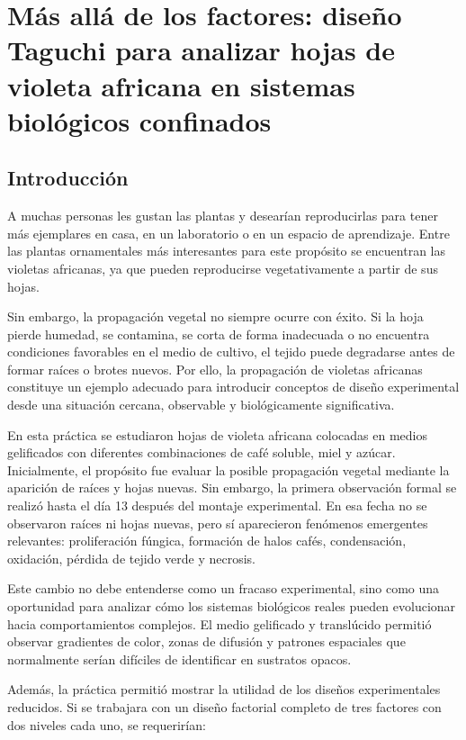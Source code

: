 \section{Más allá de los factores: diseño Taguchi para analizar hojas de violeta africana en sistemas biológicos confinados}

\subsection{Introducción}

A muchas personas les gustan las plantas y desearían reproducirlas para tener más ejemplares en casa, en un laboratorio o en un espacio de aprendizaje. Entre las plantas ornamentales más interesantes para este propósito se encuentran las violetas africanas, ya que pueden reproducirse vegetativamente a partir de sus hojas.

Sin embargo, la propagación vegetal no siempre ocurre con éxito. Si la hoja pierde humedad, se contamina, se corta de forma inadecuada o no encuentra condiciones favorables en el medio de cultivo, el tejido puede degradarse antes de formar raíces o brotes nuevos. Por ello, la propagación de violetas africanas constituye un ejemplo adecuado para introducir conceptos de diseño experimental desde una situación cercana, observable y biológicamente significativa.

En esta práctica se estudiaron hojas de violeta africana colocadas en medios gelificados con diferentes combinaciones de café soluble, miel y azúcar. Inicialmente, el propósito fue evaluar la posible propagación vegetal mediante la aparición de raíces y hojas nuevas. Sin embargo, la primera observación formal se realizó hasta el día 13 después del montaje experimental. En esa fecha no se observaron raíces ni hojas nuevas, pero sí aparecieron fenómenos emergentes relevantes: proliferación fúngica, formación de halos cafés, condensación, oxidación, pérdida de tejido verde y necrosis.

Este cambio no debe entenderse como un fracaso experimental, sino como una oportunidad para analizar cómo los sistemas biológicos reales pueden evolucionar hacia comportamientos complejos. El medio gelificado y translúcido permitió observar gradientes de color, zonas de difusión y patrones espaciales que normalmente serían difíciles de identificar en sustratos opacos.

Además, la práctica permitió mostrar la utilidad de los diseños experimentales reducidos. Si se trabajara con un diseño factorial completo de tres factores con dos niveles cada uno, se requerirían:

